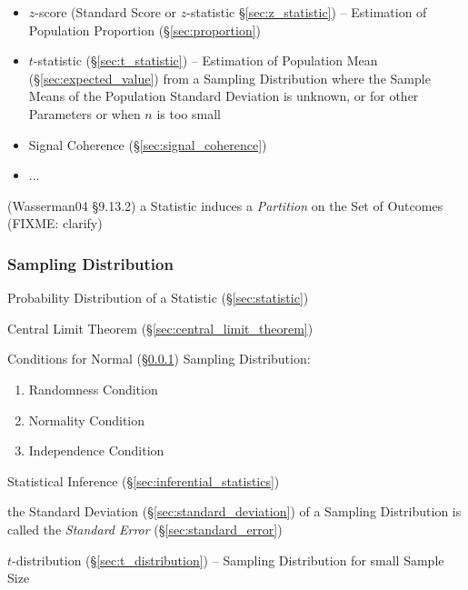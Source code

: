 \asterism

\begin{itemize}
  \item $z$-score (Standard Score or $z$-statistic \S\ref{sec:z_statistic})
    -- Estimation of Population Proportion (\S\ref{sec:proportion})
  \item $t$-statistic (\S\ref{sec:t_statistic}) -- Estimation of Population Mean
    (\S\ref{sec:expected_value}) from a Sampling Distribution where the Sample
    Means of the Population Standard Deviation is unknown, or for other
    Parameters or when $n$ is too small
\end{itemize}

\asterism

\begin{itemize}
  \item Signal Coherence (\S\ref{sec:signal_coherence})
  \item ...
\end{itemize}

\asterism

(Wasserman04 \S9.13.2) a Statistic induces a \emph{Partition} on the Set of
Outcomes (FIXME: clarify)



\subsubsection{Sampling Distribution}\label{sec:sampling_distribution}

Probability Distribution of a Statistic (\S\ref{sec:statistic})

\fist Central Limit Theorem (\S\ref{sec:central_limit_theorem})

Conditions for Normal (\S\ref{sec:sampling_distribution}) Sampling Distribution:
\begin{enumerate}
  \item Randomness Condition
  \item Normality Condition
  \item Independence Condition
\end{enumerate}

Statistical Inference (\S\ref{sec:inferential_statistics})

the Standard Deviation (\S\ref{sec:standard_deviation}) of a Sampling
Distribution is called the \emph{Standard Error} (\S\ref{sec:standard_error})

$t$-distribution (\S\ref{sec:t_distribution}) -- Sampling Distribution for small
Sample Size

